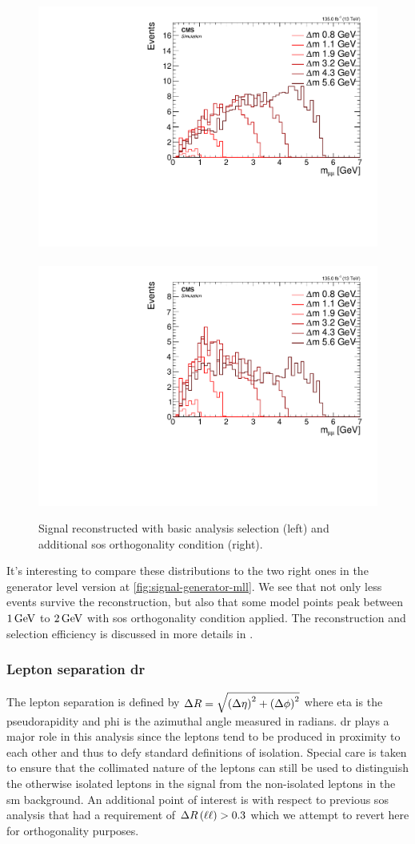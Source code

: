 \begin{figure}[h]
\centering
\includegraphics[width=0.48\linewidth]{plots/signal_muons/none_invMassCorrJetNoMultIso10Dr0.6.pdf} \,
\includegraphics[width=0.48\linewidth]{plots/signal_muons/none_invMassCorrJetNoMultIso10Dr0.6_orth.pdf}  \\
\caption[Signal reconstructed \mmumu]{ Signal reconstructed \mmumu with basic analysis selection (left) and additional \gls{sos} orthogonality condition (right).}
\label{fig:reco-signal-invamass}
\end{figure}

It's interesting to compare these distributions to the two right ones in the generator level version at \ref{fig:signal-generator-mll}. We see that not only less events survive the reconstruction, but also that some \dm model points peak between $1 \,\text{Ge\hspace{-.08em}V}$ to $2 \,\text{Ge\hspace{-.08em}V}$ with \gls{sos} orthogonality condition applied. The reconstruction and selection efficiency is discussed in more details in .

\subsubsection{Lepton separation \gls{dr}}
\label{sec:lepton-dr}

The lepton separation is defined by $\Delta R=\sqrt{\left(\Delta\eta\right)^2+\left(\Delta\phi\right)^2}$ where \gls{eta} is the pseudorapidity and \gls{phi} is the azimuthal angle measured in radians. \gls{dr} plays a major role in this analysis since the leptons tend to be produced in proximity to each other and thus to defy standard definitions of isolation. Special care is taken to ensure that the collimated nature of the leptons can still be used to distinguish the otherwise isolated leptons in the signal from the non-isolated leptons in the \gls{sm} background. An additional point of interest is with respect to previous \gls{sos} analysis  that had a requirement of $\Delta R\left(\ell\ell\right) > 0.3$ which we attempt to revert here for orthogonality purposes. 

